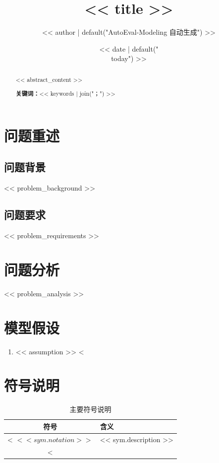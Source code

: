 \documentclass[12pt, a4paper]{article}
\title{\textbf{<< title >>}}
\author{<< author | default("AutoEval-Modeling 自动生成") >>}
\date{<< date | default("\\today") >>}
\begin{document}
\maketitle

\begin{abstract}
<< abstract_content >>

\textbf{关键词：}<< keywords | join("；") >>
\end{abstract}

\tableofcontents
\newpage

\section{问题重述}

\subsection{问题背景}
<< problem_background >>

\subsection{问题要求}
<< problem_requirements >>

\section{问题分析}
<< problem_analysis >>

\section{模型假设}
\begin{enumerate}[label=(\arabic*)]
<%
    \item << assumption >>
<%
\end{enumerate}

\section{符号说明}
\begin{table}[H]
    \centering
    \caption{主要符号说明}
    \label{tab:symbols}
    \begin{tabular}{cl}
        \toprule
        \textbf{符号} & \textbf{含义} \\
        \midrule
<%
        $<< sym.notation >>$ & << sym.description >> \\
<%
        \bottomrule
    \end{tabular}
\end{table}
\end{document}
